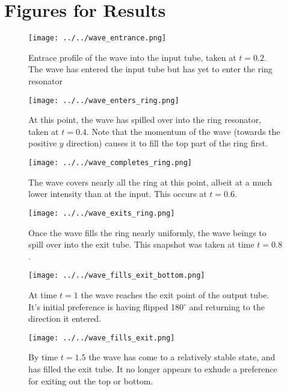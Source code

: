 \documentclass[../../main.tex]{subfiles}
\begin{document}
\section{Figures for Results}

\begin{figure}[h]
		\centering
		\texttt{[image: ../../wave\_entrance.png]}
		\caption{Entrace profile of the wave into the input tube,
				taken at $t = 0.2$. 
				The wave has entered the input tube but has yet to enter the 
		ring resonator}
		\label{fig:wave-entrance}
\end{figure}

\begin{figure}[h]
		\centering
		\texttt{[image: ../../wave\_enters\_ring.png]}
		\caption{At this point, the wave has spilled over into the ring 
				resonator,
				taken at $t = 0.4$. 
				Note that the momentum of the wave (towards the positive
				$y$ direction) causes it to fill the 
				top part of the ring first.
		}
		\label{fig:wave-enters-ring}
\end{figure}

\begin{figure}[h]
		\centering
		\texttt{[image: ../../wave\_completes\_ring.png]}
		\caption{The wave covers nearly all the ring at this point,
				albeit at a much lower intensity than at the input.
				This occurs at $t = 0.6$.
		}
		\label{fig:wave-completes-ring}
\end{figure}

\begin{figure}[h]
		\centering
		\texttt{[image: ../../wave\_exits\_ring.png]}
		\caption{Once the wave fills the ring nearly uniformly,
				the wave beings to spill over into the exit tube.
				This snapshot was taken at time $t = 0.8$.
		}
		\label{fig:wave-exits-ring}
\end{figure}

\begin{figure}[h]
		\centering
		\texttt{[image: ../../wave\_fills\_exit\_bottom.png]}
		\caption{At time $t = 1$ the wave reaches the exit point
				of the output tube.  
				It's initial preference is having flipped 180$^\circ$ 
				and returning to the direction it entered.
		}
		\label{fig:wave-exits-bottom}
\end{figure}

\begin{figure}[h]
		\centering
		\texttt{[image: ../../wave\_fills\_exit.png]}
		\caption{By time $t = 1.5$ the wave has come to a relatively
				stable state, and has filled the exit tube. 
				It no longer appears to exhude a preference for 
				exiting out the top or bottom.
		}
		\label{fig:wave-exits}
\end{figure}
\end{document}
